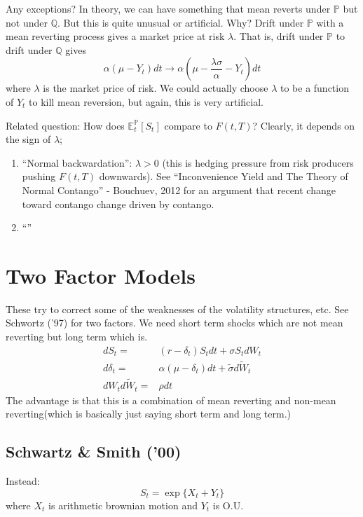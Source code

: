 Any exceptions? In theory, we can have something that mean reverts under $\mathbb{P}$ but not under $\mathbb{Q}$. But this is quite unusual or artificial. Why? Drift under $\mathbb{P}$ with a mean reverting process gives a market price at risk $\lambda$. That is, drift under $\mathbb{P}$ to drift under $\mathbb{Q}$ gives
\begin{equation}
	\alpha (\mu - Y_t)dt \to \alpha (\mu - \frac{\lambda \sigma}{\alpha} - Y_t)dt
\end{equation}
where $\lambda$ is the market price of risk.
We could actually choose $\lambda$ to be a function of $Y_t$ to kill mean reversion, but again, this is very artificial.

Related question: How does $\mathbb{E}^\mathbb{P}_t\left[ S_t\right]$ compare to $F(t,T)$? Clearly, it depends on the sign of $\lambda$;
\begin{enumerate}
	\item ``Normal backwardation'': $\lambda > 0$ (this is hedging pressure from risk producers pushing $F(t,T)$ downwards). See ``Inconvenience Yield and The Theory of Normal Contango'' -  Bouchuev, 2012 for an argument that recent change toward contango change driven by contango.
	\item ``''
\end{enumerate}


\section{Two Factor Models}
These try to correct some of the weaknesses of the volatility structures, etc. See Schwortz ('97) for two factors. We need short term shocks which are not mean reverting but long term which is.
\begin{align}
	dS_t =& (r-\delta_t) S_t dt + \sigma S_t dW_t\\
	d\delta_t =& \alpha(\mu - \delta_t)dt + \tilde{\sigma} d\tilde{W}_t\\
	dW_t d\tilde{W}_t =& \rho dt
\end{align}
The advantage is that this is a combination of mean reverting and non-mean reverting(which is basically just saying short term and long term.)

\subsection{Schwartz \& Smith ('00)}
Instead:
\begin{equation}
	S_t = \exp \{ X_t + Y_t \}
\end{equation}
where $X_t$ is arithmetic brownian motion and $Y_t$ is O.U.

